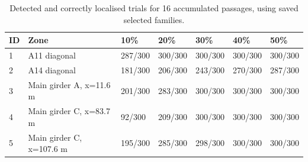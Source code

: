 \begin{table}[htbp]
\centering
\small
\setlength{\tabcolsep}{4pt}
\caption{Detected and correctly localised trials for 16 accumulated passages, using saved selected families.}
\label{tab:kw51-accepted-16}
\begin{tabular}{@{}lllllll@{}}
\toprule
ID & Zone & 10\% & 20\% & 30\% & 40\% & 50\% \\
\midrule
1 & A11 diagonal & 287/300 & 300/300 & 300/300 & 300/300 & 300/300 \\
2 & A14 diagonal & 181/300 & 206/300 & 243/300 & 270/300 & 287/300 \\
3 & Main girder A, x=11.6 m & 201/300 & 283/300 & 300/300 & 300/300 & 300/300 \\
4 & Main girder C, x=83.7 m & 92/300 & 209/300 & 300/300 & 300/300 & 300/300 \\
5 & Main girder C, x=107.6 m & 195/300 & 285/300 & 298/300 & 300/300 & 300/300 \\
\bottomrule
\end{tabular}
\end{table}

